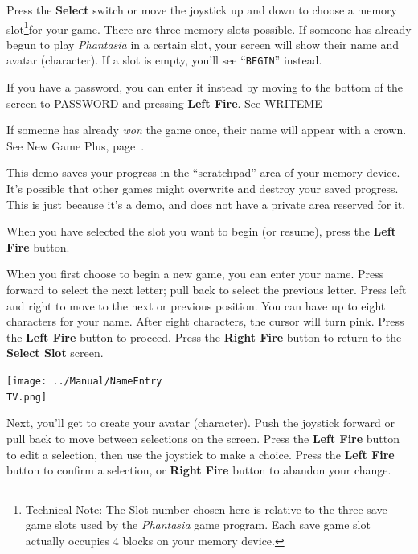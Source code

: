 \documentclass[10pt,twocolumn,openany,article]{memoir}
\newcommand\TV{NTSC}
\newcommand\TV{PAL}
\begin{document}
Press the  \textbf{ Select} switch or  move the joystick up  and down to
choose   a  memory   slot\ifdefined\ATARIAGESAVE\else\footnote{Technical
  Note: The Slot  number chosen here is relative to  the three save game
  slots used by the \textit{Phantasia} game program. Each save game slot
  actually occupies 4  blocks on your memory device.}\fi  for your game.
There are three  memory slots possible. If someone has  already begun to
play \textit{Phantasia} in  a certain slot, your screen  will show their
name  and   avatar  (character).  If   a  slot  is  empty,   you'll  see
``\texttt{BEGIN}'' instead.

If you have a password, you can enter it instead by moving to the bottom
of the screen to PASSWORD and pressing \textbf{Left Fire}. See WRITEME

If someone has already \emph{won} the  game once, their name will appear
with a crown. See New Game Plus, page~\pageref{sec:NewGamePlus}.

\ifdefined\DEMO

\skip

This demo saves your progress in  the ``scratchpad'' area of your memory
device. It's possible that other  games might overwrite and destroy your
saved progress.  This is  just because  it's a demo,  and does  not have
a private area reserved for it.

\skip

\fi

When you have selected the slot you want to begin (or resume), press the
\textbf{Left Fire} button.

\fi

When you  first choose  to begin a  new game, you  can enter  your name.
Press  forward to  select  the  next letter;  pull  back  to select  the
previous letter.  Press left and right  to move to the  next or previous
position. You  can have up  to eight characters  for your name.  After eight
characters, the cursor will turn pink. Press the \textbf{Left Fire} button
to  proceed. Press  the  \textbf{Right  Fire} button  to  return to  the
\textbf{Select Slot} screen.

\begin{center}
  \texttt{[image: ../Manual/NameEntry\\TV.png]}
\end{center}

Next, you'll  get to create  your avatar (character). Push  the joystick
forward or pull back to move  between selections on the screen. Press the
\textbf{Left Fire} button to edit a  selection, then use the joystick to
make  a  choice.   Press  the  \textbf{Left  Fire}   button  to  confirm
a selection, or \textbf{Right Fire} button to abandon your change.
\end{document}

